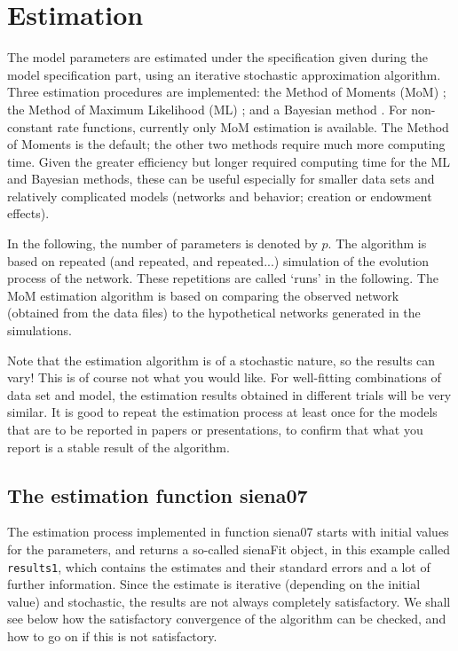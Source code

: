 \documentclass[a4paper,fleqn,11pt]{article}
\newcommand{\+}{\, + \,}
\begin{document}
\newpage

\section{Estimation}
\label{S_Est}

The model parameters are estimated under the specification given
during the model specification part, using an iterative stochastic
approximation algorithm.
Three estimation procedures are implemented:
the Method of Moments (MoM) \citep*{Snijders01, SnijdersEA07};
 the Method of Maximum Likelihood (ML) \citep{SnijdersEA10a};
 and a Bayesian method
 \citep{Koskinen04, KoskinenSnijders07,SchweinbergerSnijders07c}.
 For non-constant rate functions, currently only
 MoM estimation is available.
 The Method of Moments is the default;
 the other two methods require much more computing time.
 Given the greater efficiency but longer required computing time
 for the ML and Bayesian methods,
 these can be useful especially for smaller data sets
 and relatively complicated models
 (networks and behavior; creation or endowment effects).


In the following, the number of
parameters is denoted by $p$. The algorithm %
is based on repeated
(and repeated, and repeated...) simulation of the evolution
process of the network. These repetitions are called `runs' in the
following. The MoM estimation algorithm is based on comparing the
observed network (obtained from the data files)
to the hypothetical networks generated in the simulations.

Note that the estimation algorithm is of a stochastic nature, so
the results can vary! This is of course not what you would like.
For well-fitting combinations of data set and model, the
estimation results obtained in different trials will be very
similar. It is good to repeat the estimation process at least once
for the models that are to be reported in papers or presentations,
to confirm that what you report is a stable result of the
algorithm.

\subsection{The estimation function \textsf{siena07}}
\hypertarget{T_S_options}{   }

The estimation process implemented in function \textsf{siena07}
starts with initial values for the parameters,
and returns a so-called \textsf{sienaFit} object, in this example called
\texttt{results1}, which contains the estimates and their standard errors and
a lot of further information.
Since the estimate is iterative (depending on the initial value) and stochastic,
the results are not always completely satisfactory. We shall see below
how the satisfactory convergence of the algorithm can be checked,
and how to go on if this is not satisfactory.
\end{document}
